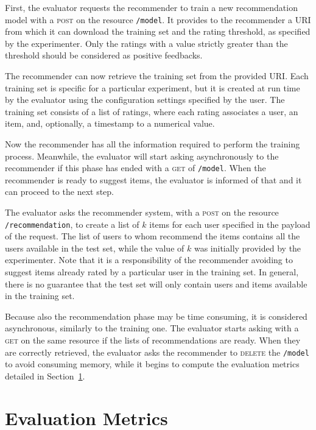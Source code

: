 First, the evaluator requests the recommender to train a new recommendation model with a \textsc{post} on the resource \texttt{/model}. It provides to the recommender a URI from which it can download the training set and the rating threshold, as specified by the experimenter. Only the ratings with a value strictly greater than the threshold should be considered as positive feedbacks.

The recommender can now retrieve the training set from the provided URI. Each training set is specific for a particular experiment, but it is created at run time by the evaluator using the configuration settings specified by the user. The training set consists of a list of ratings, where each rating associates a user, an item, and, optionally, a timestamp to a numerical value.

Now the recommender has all the information required to perform the training process. Meanwhile, the evaluator will start asking asynchronously to the recommender if this phase has ended with a \textsc{get} of \texttt{/model}. When the recommender is ready to suggest items, the evaluator is informed of that and it can proceed to the next step.

The evaluator asks the recommender system, with a \textsc{post} on the resource \texttt{/recommendation}, to create a list of $k$ items for each user specified in the payload of the request. The list of users to whom recommend the items contains all the users available in the test set, while the value of $k$ was initially provided by the experimenter. Note that it is a responsibility of the recommender avoiding to suggest items already rated by a particular user in the training set. In general, there is no guarantee that the test set will only contain users and items available in the training set.

Because also the recommendation phase may be time consuming, it is considered asynchronous, similarly to the training one. The evaluator starts asking with a \textsc{get} on the same resource if the lists of recommendations are ready. When they are correctly retrieved, the evaluator asks the recommender to \textsc{delete} the \texttt{/model} to avoid consuming memory, while it begins to compute the evaluation metrics detailed in Section~\ref{lab:sec:metrics}.

\section{Evaluation Metrics}
\label{lab:sec:metrics}

